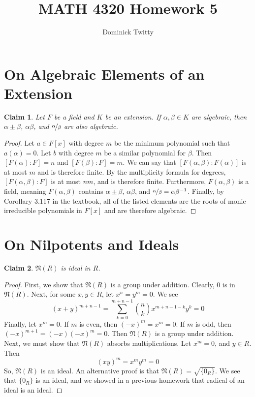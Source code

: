 \documentclass[12pt]{article}
\newtheorem*{claim*}{Claim}
\newcommand*{\nil}{\mathfrak{N}}
\newcommand*{\inv}{^{-1}}
\begin{document}
\title{MATH 4320 Homework 5}
\author{Dominick Twitty}
\date{}
\maketitle

\section{On Algebraic Elements of an Extension}
\begin{claim*}
Let $F$ be a field and $K$ be an extension. If $\alpha, \beta \in K$ are algebraic, then $\alpha \pm \beta$, $\alpha \beta$, and $\nicefrac{\alpha}{\beta}$ are also algebraic.
\end{claim*}
\begin{proof}
Let $a \in F[x]$ with degree $m$ be the minimum polynomial such that $a(\alpha) = 0$. Let $b$ with degree $m$ be a similar polynomial for $\beta$. Then $[F(\alpha) : F] = n$ and $[F(\beta) : F] = m$. We can say that $[F(\alpha, \beta) : F(\alpha)]$ is at most $m$ and is therefore finite. By the multiplicity formula for degrees, $[F(\alpha,\beta) : F]$ is at most $nm$, and is therefore finite. Furthermore, $F(\alpha, \beta)$ is a field, meaning $F(\alpha, \beta)$ contains $\alpha \pm \beta$, $\alpha \beta$, and $\nicefrac{\alpha}{\beta} = \alpha \beta\inv$. Finally, by Corollary 3.117 in the textbook, all of the listed elements are the roots of monic irreducible polynomials in $F[x]$ and are therefore algebraic.
\end{proof}



\section{On Nilpotents and Ideals}
\begin{claim*}
$\nil(R)$ is ideal in $R$.
\end{claim*}
\begin{proof}
First, we show that $\nil(R)$ is a group under addition. Clearly, $0$ is in $\nil(R)$. Next, for some $x,y \in R$, let $x^n = y^m = 0$. We see
\[ (x + y) ^ {m + n - 1} = \sum_{k = 0}^{m + n - 1} \binom{n}{k} x^{m + n - 1 - k} y^k = 0\]
Finally, let $x ^ m = 0$. If $m$ is even, then $(-x) ^ m = x ^ m = 0$. If $m$ is odd, then $(-x) ^ {m + 1} = (-x)(-x)^m = 0$. Then $\nil(R)$ is a group under addition. Next, we must show that $\nil(R)$ absorbs multiplications. Let $x^m = 0$, and $y \in R$. Then
\[ (xy) ^ m = x^m y^m = 0 \]
So, $\nil(R)$ is an ideal. An alternative proof is that $\nil(R) = \sqrt{\{0_R\}}$. We see that $\{0_R\}$ is an ideal, and we showed in a previous homework that radical of an ideal is an ideal.
\end{proof}
\end{document}
